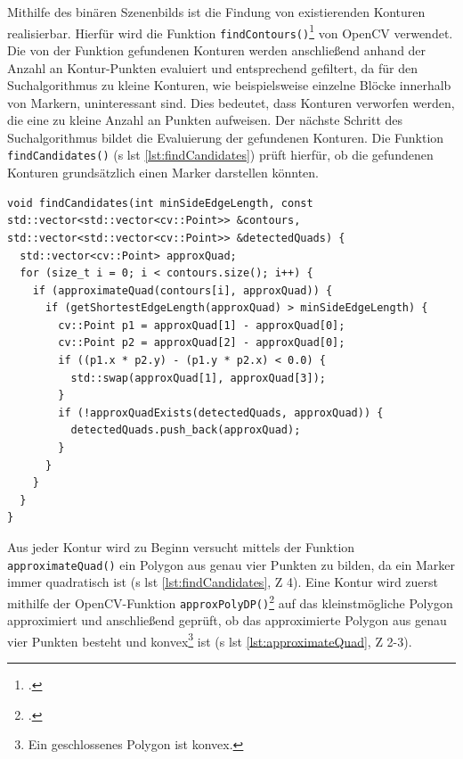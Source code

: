 \noindent Mithilfe des binären Szenenbilds ist die Findung von existierenden Konturen realisierbar. Hierfür wird die Funktion \texttt{findContours()}\footcite{opencvfindContours} von OpenCV verwendet. Die von der Funktion gefundenen Konturen werden anschließend anhand der Anzahl an Kontur-Punkten evaluiert und entsprechend gefiltert, da für den Suchalgorithmus zu kleine Konturen, wie beispielsweise einzelne Blöcke innerhalb von Markern, uninteressant sind. Dies bedeutet, dass Konturen verworfen werden, die eine zu kleine Anzahl an Punkten aufweisen. Der nächste Schritt des Suchalgorithmus bildet die Evaluierung der gefundenen Konturen. Die Funktion \texttt{findCandidates()} (\acs{s} \acs{lst} \ref{lst:findCandidates}) prüft hierfür, ob die gefundenen Konturen grundsätzlich einen Marker darstellen könnten.

\begin{lstlisting}[caption={Die Funktion \texttt{detectormarkerbased.cpp/findCandidates();} evaluiert, ob die übergebenen Konturen grundsätzlich einen Marker darstellen könnten}, label={lst:findCandidates}]
void findCandidates(int minSideEdgeLength, const std::vector<std::vector<cv::Point>> &contours, std::vector<std::vector<cv::Point>> &detectedQuads) {
  std::vector<cv::Point> approxQuad;
  for (size_t i = 0; i < contours.size(); i++) {
    if (approximateQuad(contours[i], approxQuad)) {
      if (getShortestEdgeLength(approxQuad) > minSideEdgeLength) {
        cv::Point p1 = approxQuad[1] - approxQuad[0];
        cv::Point p2 = approxQuad[2] - approxQuad[0];
        if ((p1.x * p2.y) - (p1.y * p2.x) < 0.0) {
          std::swap(approxQuad[1], approxQuad[3]);
        }
        if (!approxQuadExists(detectedQuads, approxQuad)) {
          detectedQuads.push_back(approxQuad);
        }
      }
    }
  }
}
\end{lstlisting}

\noindent Aus jeder Kontur wird zu Beginn versucht mittels der Funktion \texttt{approximateQuad()} ein Polygon aus genau vier Punkten zu bilden, da ein Marker immer quadratisch ist (\acs{s} \acs{lst} \ref{lst:findCandidates}, \acs{Z} 4). Eine Kontur wird zuerst mithilfe der OpenCV-Funktion \texttt{approxPolyDP()}\footcite{opencvapproxPolyDP} auf das kleinstmögliche Polygon approximiert und anschließend geprüft, ob das approximierte Polygon aus genau vier Punkten besteht und konvex\footnote{Ein geschlossenes Polygon ist konvex.} ist (\acs{s} \acs{lst} \ref{lst:approximateQuad}, \acs{Z} 2-3).

\newpage

